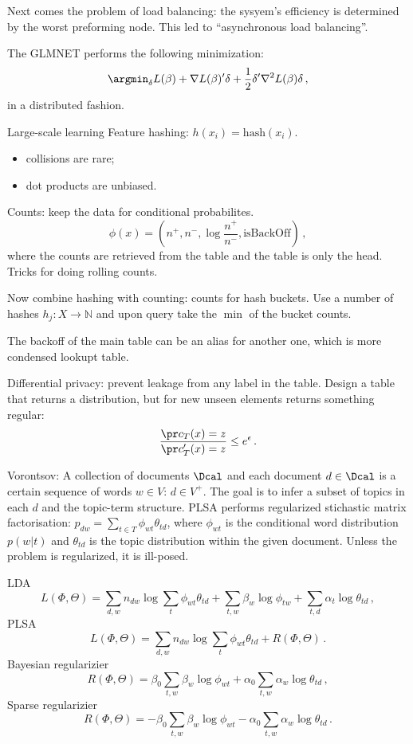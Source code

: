 Next comes the problem of load balancing: the sysyem's efficiency is determined
by the worst preforming node. This led to ``asynchronous load balancing''.

The GLMNET performs the following minimization:
\[ \argmin_{\delta} L(\beta) + \nabla L(\beta)'\delta
		+ \frac{1}{2} \delta' \nabla^2L(\beta)\delta\,, \]
in a distributed fashion.

Large-scale learning
Feature hashing: $h(x_i) = \text{hash}(x_i)$.\begin{itemize}
	\item collisions are rare;
	\item dot products are unbiased.
\end{itemize}
Counts: keep the data for conditional probabilites.
\[ \phi(x) = ( n^+, n^-, \log\frac{n^+}{n^-}, \text{isBackOff}) \,, \]
where the counts are retrieved from the table and the table is 
only the head. Tricks for doing rolling counts.

Now combine hashing with counting: counts for hash buckets. Use a number of hashes
$h_j:X\to \mathbb{N}$ and upon query take the $\min$ of the bucket counts.

The backoff of the main table can be an alias for another one, which is more
condensed lookupt table.

Differential privacy: prevent leakage from any label in the table.
Design a table that returns a distribution, but for new unseen elements returns
something regular:
\[\frac{\pr c_T(x) = z }{\pr c_T'(x) = z } \leq e^\epsilon \,. \]


Vorontsov:
A collection of documents $\Dcal$ and each document $d\in \Dcal$ is a certain sequence
of words $w\in V$: $d\in V^+$. The goal is to infer a subset of topics in each $d$ and 
the topic-term structure. PLSA performs regularized stichastic matrix factorisation:
$p_{dw} = \sum_{t\in T}\phi_{wt} \theta_{td}$, where $\phi_{wt}$ is the conditional word
distribution $p(w|t)$ and $\theta_{td}$ is the topic distribution within the given
document. Unless the problem is regularized, it is ill-posed.

LDA
\[ L(\Phi,\Theta)
	= \sum_{d,w} n_{dw} \log \sum_t \phi_{wt}\theta_{td}
		+ \sum_{t,w}\beta_w \log \phi_{tw}
		+ \sum_{t,d}\alpha_t \log \theta_{td} \,, \]
PLSA 
\[ L(\Phi,\Theta)
	= \sum_{d,w} n_{dw} \log \sum_t \phi_{wt}\theta_{td}
		+ R(\Phi,\Theta) \,. \]
Bayesian regularizier
\[ R(\Phi,\Theta) =
	\beta_0 \sum_{t,w} \beta_w \log\phi_{wt}
	+ \alpha_0 \sum_{t,w} \alpha_w \log\theta_{td} \,, \]
Sparse regularizier
\[ R(\Phi,\Theta) = -
	\beta_0 \sum_{t,w} \beta_w \log\phi_{wt}
	- \alpha_0 \sum_{t,w} \alpha_w \log\theta_{td} \,. \]

